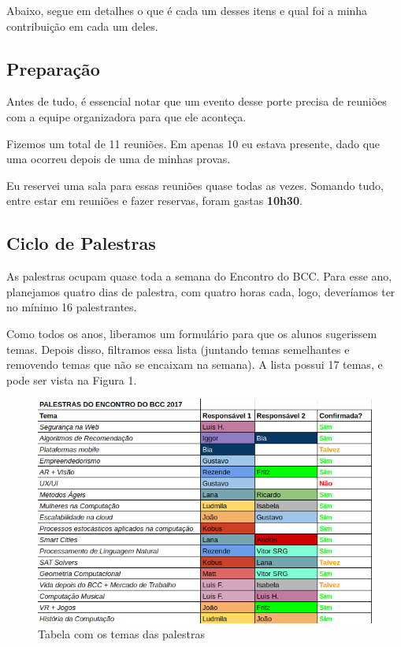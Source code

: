 \documentclass[12pt,letterpaper]{article}
\begin{document}
	Abaixo, segue em detalhes o que é cada um desses itens e qual foi a minha contribuição em cada um deles.
	
	\subsection{Preparação}
	
	Antes de tudo, é essencial notar que um evento desse porte precisa de reuniões com a equipe organizadora para que ele aconteça. 
	
	Fizemos um total de 11 reuniões. Em apenas 10 eu estava presente, dado que uma ocorreu depois de uma de minhas provas.
	
	Eu reservei uma sala para essas reuniões quase todas as vezes. Somando tudo, entre estar em reuniões e fazer reservas, foram gastas \textbf{10h30}.
	
	\subsection{Ciclo de Palestras}
	
	As palestras ocupam quase toda a semana do Encontro do BCC. Para esse ano, planejamos quatro dias de palestra, com quatro horas cada, logo, deveríamos ter no mínimo 16 palestrantes.
	
	Como todos os anos, liberamos um formulário para que os alunos sugerissem temas. Depois disso, filtramos essa lista (juntando temas semelhantes e removendo temas que não se encaixam na semana). A lista possui 17 temas, e pode ser vista na Figura 1.
	
	\begin{figure}
		\begin{center}
			\includegraphics[scale=0.6]{palestras.png} 
			\caption{Tabela com os temas das palestras}
		\end{center}
	\end{figure}
\end{document}
